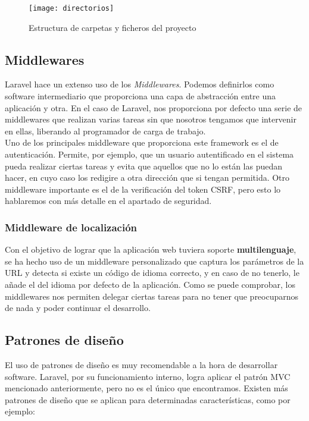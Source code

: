 \begin{figure}
    \centering
    \texttt{[image: directorios]}
    \caption{Estructura de carpetas y ficheros del proyecto}
    \label{directorios}
\end{figure}

\subsection{Middlewares}
Laravel hace un extenso uso de los \textit{Middlewares}. Podemos definirlos como software intermediario que proporciona una capa de abstracción entre una aplicación y otra. En el caso de Laravel, nos proporciona por defecto una serie de middlewares que realizan varias tareas sin que nosotros tengamos que intervenir en ellas, liberando al programador de carga de trabajo.\\

Uno de los principales middleware que proporciona este framework es el de autenticación. Permite, por ejemplo, que un usuario autentificado en el sistema pueda realizar ciertas tareas y evita que aquellos que no lo están las puedan hacer, en cuyo caso los redigire a otra dirección que si tengan permitida. Otro middleware importante es el de la verificación del token CSRF, pero esto lo hablaremos con más detalle en el apartado de seguridad.

\subsubsection{Middleware de localización}
Con el objetivo de lograr que la aplicación web tuviera soporte \textbf{multilenguaje}, se ha hecho uso de un middleware personalizado que captura los parámetros de la URL y detecta si existe un código de idioma correcto, y en caso de no tenerlo, le añade el del idioma por defecto de la aplicación. Como se puede comprobar, los middlewares nos permiten delegar ciertas tareas para no tener que preocuparnos de nada y poder continuar el desarrollo.

\subsection{Patrones de diseño}
El uso de patrones de diseño es muy recomendable a la hora de desarrollar software. Laravel, por su funcionamiento interno, logra aplicar el patrón MVC mencionado anteriormente, pero no es el único que encontramos. Existen más patrones de diseño que se aplican para determinadas características, como por ejemplo:

